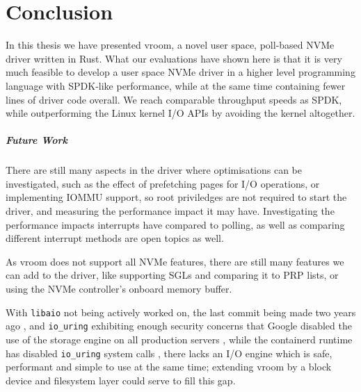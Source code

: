 \chapter{Conclusion}\label{c:c}
In this thesis we have presented vroom, a novel user space, poll-based NVMe driver written in Rust. What our evaluations have shown here is that it is very much feasible to develop a user space NVMe driver in a higher level programming language with SPDK-like performance, while at the same time containing fewer lines of driver code overall. We reach comparable throughput speeds as SPDK, while outperforming the Linux kernel I/O APIs by avoiding the kernel altogether.

\paragraph{Future Work}
There are still many aspects in the driver where optimisations can be investigated, such as the effect of prefetching pages for I/O operations, or implementing IOMMU support, so root priviledges are not required to start the driver, and measuring the performance impact it may have. Investigating the performance impacts interrupts have compared to polling, as well as comparing different interrupt methods are open topics as well.

As vroom does not support all NVMe features, there are still many features we can add to the driver, like supporting SGLs and comparing it to PRP lists, or using the NVMe controller's onboard memory buffer.

With \texttt{libaio} not being actively worked on, the last commit being made two years ago \cite{libaio-source}, and \texttt{io\_uring} exhibiting enough security concerns that Google disabled the use of the storage engine on all production servers \cite{google-iou}, while the containerd runtime has disabled \texttt{io\_uring} system calls \cite{containerdeez-nuts}, there lacks an I/O engine which is safe, performant and simple to use at the same time; extending vroom by a block device and filesystem layer could serve to fill this gap.
